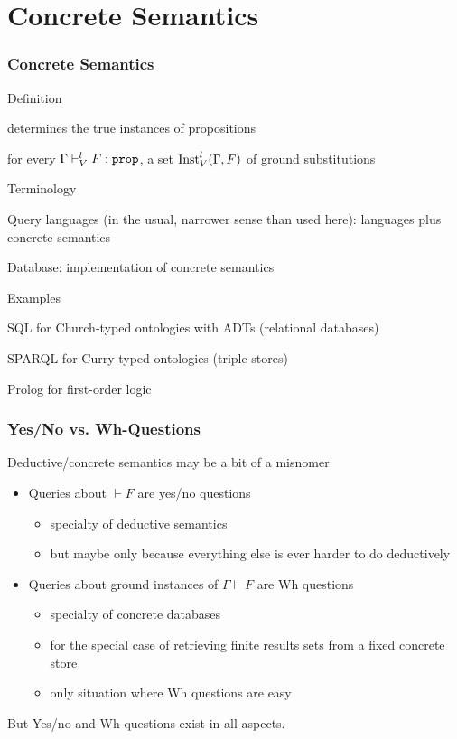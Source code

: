 \section{Concrete Semantics}

\begin{frame}\frametitle{Concrete Semantics}
\begin{blockitems}{Definition}
\item determines the true instances of propositions
\item for every $\Gamma\vdash^l_V F:\prop$, a set $\mathrm{Inst}^l_V(\Gamma,F)$ of ground substitutions
\end{blockitems}

\begin{blockitems}{Terminology}
\item Query languages (in the usual, narrower sense than used here): languages plus concrete semantics
\item Database: implementation of concrete semantics
\end{blockitems}

\begin{blockitems}{Examples}
\item SQL for Church-typed ontologies with ADTs (relational databases)
\item SPARQL for Curry-typed ontologies (triple stores)
\item Prolog for first-order logic
\end{blockitems}
\end{frame}

\begin{frame}\frametitle{Yes/No vs. Wh-Questions}
Deductive/concrete semantics may be a bit of a misnomer
\begin{itemize}
\item Queries about $\vdash F$ are yes/no questions
 \begin{itemize}
 \item specialty of deductive semantics
 \item but maybe only because everything else is ever harder to do deductively
 \end{itemize}
\item Queries about ground instances of $\Gamma \vdash F$ are Wh questions
 \begin{itemize}
 \item specialty of concrete databases
 \item for the special case of retrieving finite results sets from a fixed concrete store
 \item only situation where Wh questions are easy
 \end{itemize}
\end{itemize}
But Yes/no and Wh questions exist in all aspects.
\end{frame}

